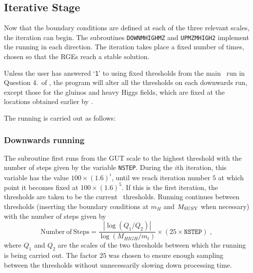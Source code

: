 \subsection{Iterative Stage}\label{sec:iterate}

Now that the boundary conditions are defined at each of the three
relevant scales, the iteration can begin. The subroutines
\texttt{DOWNMHIGHMZ} and \texttt{UPMZMHIGH2} implement the running in
each direction. The iteration takes place a fixed number of times,
chosen so that the RGEs reach a stable solution.

Unless the user has answered `\verb+1+' to using fixed thresholds from
the main \progisasug~run in Question 4.~of \inrge, the program will
alter all the thresholds on each downwards run, except those for the
gluinos and heavy Higgs fields, which are fixed at the locations
obtained earlier by \progisasug.

The running is carried out as follows:

\subsubsection*{Downwards running}

The subroutine first runs from the GUT scale to the highest threshold
with the number of steps given by the variable \texttt{NSTEP}. During
the $i$th iteration, this variable has the value $100\times(1.6)^{i}$,
until we reach iteration number $5$ at which point it becomes fixed at
$100\times(1.6)^{5}$. If this is the first iteration, the thresholds are
taken to be the current \progisasug~thresholds. Running continues
between thresholds (inserting the boundary conditions at $m_{H}$ and
$M_{\mathrm{SUSY}}$ when necessary) with the number of steps given by
\begin{equation}
\mathrm{Number\ of\ Steps}=\frac{\left|\log{\left(Q_{1}/Q_{2}\right)}\right|}{\log{(M_{HIGH}/m_{t})}}\times(25\times\mathtt{NSTEP})\;,
\end{equation} where $Q_{1}$ and $Q_{2}$ are the scales of the two
thresholds between which the running is being carried out. The factor
$25$ was chosen to ensure enough sampling between the thresholds without
unnecessarily slowing down processing time.

